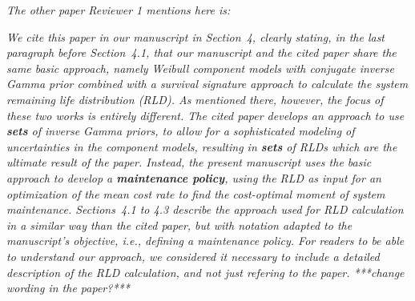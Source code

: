 \documentclass[authoryear]{elsarticle}
\begin{document}
\smallskip

\emph{The other paper Reviewer 1 mentions here is:}

\nocite{2016:walter-coolen}


\smallskip

\emph{We cite this paper in our manuscript in Section~4,
clearly stating, in the last paragraph before Section~4.1,
that our manuscript and the cited paper share the same basic approach, namely
Weibull component models with conjugate inverse Gamma prior
combined with a survival signature approach to calculate the system remaining life distribution (RLD).
As mentioned there, however, the focus of these two works is entirely different.
The cited paper develops an approach to use \textbf{sets} of inverse Gamma priors,
to allow for a sophisticated modeling of uncertainties in the component models,
resulting in \textbf{sets} of RLDs which are the ultimate result of the paper.
Instead, the present manuscript uses the basic approach to develop a \textbf{maintenance policy},
using the RLD as input for an optimization of the mean cost rate to find the cost-optimal moment of system maintenance.
Sections~4.1 to 4.3 describe the approach used for RLD calculation
in a similar way than the cited paper,
but with notation adapted to the manuscript's objective, i.e., defining a maintenance policy.
For readers to be able to understand our approach,
we considered it necessary to include a detailed description of the RLD calculation,
and not just refering to the paper. ***change wording in the paper?***
}

\medskip
\end{document}

